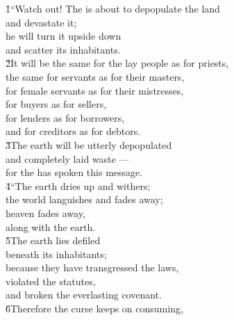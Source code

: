 \begin{poetry}
\poeml {}
\v{1}``Watch out! The  is about to depopulate the land \\
\poemll    and devastate it; \\
\poeml he will turn it upside down \\
\poemll    and scatter its inhabitants. \\
\poeml \v{2}It will be the same for the lay people as for priests, \\
\poemll    the same for servants as for their masters, \\
\poeml for female servants as for their mistresses, \\
\poemll    for buyers as for sellers, \\
\poeml for lenders as for borrowers, \\
\poemll    and for creditors as for debtors. \\
\poeml \v{3}The earth will be utterly depopulated \\
\poemll    and completely laid waste --- \\
\poemlll       for the  has spoken this message. \\
\poeml \v{4}``The earth dries up and withers; \\
\poemll    the world languishes and fades away; \\
\poeml heaven fades away, \\
\poemll    along with the earth. \\
\poeml \v{5}The earth lies defiled \\
\poemll    beneath its inhabitants; \\
\poeml because they have transgressed the laws, \\
\poeml violated the statutes, \\
\poeml and broken the everlasting covenant. \\
\poeml \v{6}Therefore the curse keeps on consuming, \\

\end{poetry}
